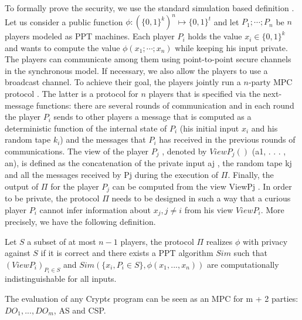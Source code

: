 To formally prove the security, we use the standard simulation based definition \cite{Goldreich}.
Let us consider a public function $\phi: (\{0,1\}^k)^n\mapsto \{0,1\}^t$ and let $P_1; \cdots ; P_n$ be $n$ players modeled
as PPT machines. Each player $P_i$ holds the value $x_i \in \{0,1\}^k$ and wants to compute the
value $\phi(x_1;\cdots ; x_n)$ while keeping his input private. The players can communicate among
them using point-to-point secure channels in the synchronous model. If necessary, we
also allow the players to use a broadcast channel. To achieve their goal, the players jointly
run a $n$-party MPC protocol . The latter is a protocol for $n$ players that is specified via the
next-message functions: there are several rounds of communication and in each round the player $P_i$ sends to other players a message that is computed as a deterministic function
of the internal state of $P_i$ (his initial input $x_i$ and his random tape $k_i$) and the messages
that $P_i$ has received in the previous rounds of communications. The view of the player $P_j$
,
denoted by $ViewP_j()$
(a1, . . . , an), is defined as the concatenation of the private input aj
, the
random tape kj and all the messages received by Pj during the execution of $\Pi$. Finally, the
output of $\Pi$ for the player $P_j$ can be computed from the view ViewPj
. In order to be private,
the protocol $\Pi$ needs to be designed in such a way that a curious player $P_i$ cannot infer
information about $x_j, j \neq i$  from his view $ViewP_i$.
More precisely, we have the following definition.

\begin{definition}  Let $S$ a subset of at most $n - 1$ players, the protocol $\Pi$ realizes $\phi$ with privacy against
$S$ if it is correct and there exists a PPT algorithm $Sim$ such that $(ViewP_i)_{P_i\in S}$ and
$Sim(\{x_i,P_i\in S\} , \phi(x_1, . . . , x_n))$ are computationally indistinguishable for all inputs.
 \end{definition}
The evaluation of any Crypt$\epsilon$ program can  be seen as an MPC for m + 2 parties: $DO_1, . . . , DO_m$, AS and
CSP.

